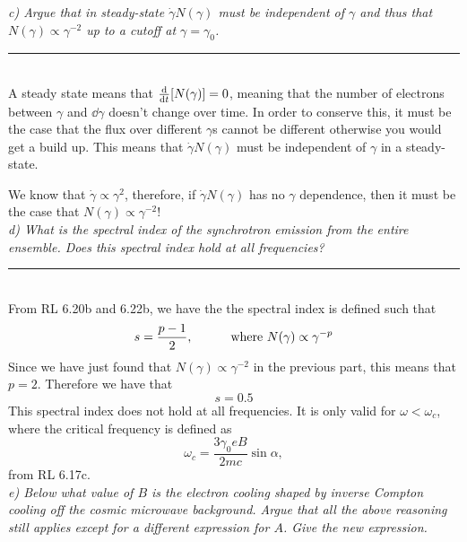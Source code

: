 \documentclass[12pt, letterpaper, twoside]{article}
\newcommand{\answer}[1]{
    \par\noindent\rule{\textwidth}{0.4pt}\\#1\\
}
\begin{document}
{\it c)  Argue that in steady-state $\dot \gamma N(\gamma)$ must be independent of $\gamma$ and thus that $N(\gamma) \propto \gamma^{-2}$ up to a cutoff at $\gamma = \gamma_0$.}

\answer{
    A steady state means that $\dv{t}[N(\gamma)] = 0$, meaning that the number of electrons between $\gamma$ and $\dd{\gamma}$ doesn't change over time. In order to conserve this, it must be the case that the flux over different $\gamma$s cannot be different otherwise you would get a build up. This means that $\dot \gamma N(\gamma)$ must be independent of $\gamma$ in a steady-state.
    
    \noindent We know that $\dot \gamma \propto \gamma^2$, therefore, if $\dot \gamma N(\gamma)$ has no $\gamma$ dependence, then it must be the case that $N(\gamma) \propto \gamma^{-2}$!
}

{\it d) What is the spectral index of the synchrotron emission from the entire ensemble. Does this spectral index hold at all frequencies?}

\answer{
    From RL 6.20b and 6.22b, we have the the spectral index is defined such that
    \begin{equation}
        s = \frac{p - 1}{2},\qquad \quad {\rm where\ } N(\gamma) \propto \gamma^{-p}
    \end{equation}
    Since we have just found that $N(\gamma) \propto \gamma^{-2}$ in the previous part, this means that $p = 2$. Therefore we have that
    \begin{equation}
        \boxed{ s = 0.5 }
    \end{equation}
    This spectral index does not hold at all frequencies. It is only valid for $\omega < \omega_c$, where the critical frequency is defined as
    \begin{equation}
        \omega_c = \frac{3 \gamma_0 e B}{2 m c} \sin \alpha,
    \end{equation}
    from RL 6.17c.
}

{\it e) Below what value of $B$ is the electron cooling shaped by inverse Compton cooling off the cosmic microwave background. Argue that all the above reasoning still applies except for a different expression for $A$.  Give the new expression.}
\end{document}

